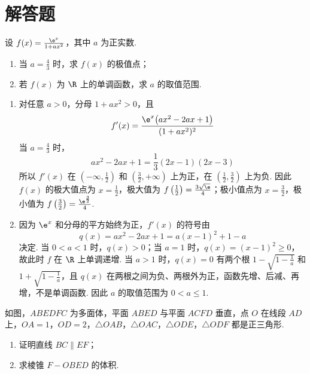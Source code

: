 \section{解答题}

\begin{problem}
设 \( f(x) = \frac{\e^x}{1 + ax^2} \)，其中 \( a \) 为正实数.

\begin{enumerate}
\item 当 \(a=\frac{4}{3}\) 时，求 \( f(x) \) 的极值点；
\item 若 \( f(x) \) 为 \(\R\) 上的单调函数，求 \( a \) 的取值范围.
\end{enumerate}
\end{problem}

\begin{solution}
\begin{enumerate}
\item 对任意 \(a>0\)，分母 \(1+ax^2>0\)，且
\[
f'(x)=\frac{\e^x\bigl(ax^2-2ax+1\bigr)}{(1+ax^2)^2}
\]
当 \(a=\frac43\) 时，
\[
ax^2-2ax+1=\frac13(2x-1)(2x-3)
\]
所以 \(f'(x)\) 在 \(\left(-\infty,\frac12\right)\) 和 \(\left(\frac32,+\infty\right)\) 上为正，在 \(\left(\frac12,\frac32\right)\) 上为负. 因此 \(f(x)\) 的极大值点为 \(x=\frac12\)，极大值为 \(f\left(\frac12\right)=\frac{3\sqrt{\e}}4\)；极小值点为 \(x=\frac32\)，极小值为 \(f\left(\frac32\right)=\frac{\e^{\frac{3}{2}}}4\).
\item 因为 \(\e^x\) 和分母的平方始终为正，\(f'(x)\) 的符号由
\[
q(x)=ax^2-2ax+1=a(x-1)^2+1-a
\]
决定. 当 \(0<a<1\) 时，\(q(x)>0\)；当 \(a=1\) 时，\(q(x)=(x-1)^2\geqslant0\)，故此时 \(f\) 在 \(\R\) 上单调递增. 当 \(a>1\) 时，\(q(x)=0\) 有两个根 \(1-\sqrt{1-\frac1a}\) 和 \(1+\sqrt{1-\frac1a}\)，且 \(q(x)\) 在两根之间为负、两根外为正，函数先增、后减、再增，不是单调函数. 因此 \(a\) 的取值范围为 \(0<a\leqslant1\).
\end{enumerate}
\end{solution}

\begin{problem}
如图，\(ABEDFC\) 为多面体，平面 \(ABED\) 与平面 \(ACFD\) 垂直，点 \(O\) 在线段 \(AD\) 上，\(OA = 1\)，\(OD = 2\)，\(\triangle OAB\)，\(\triangle OAC\)，\(\triangle ODE\)，\(\triangle ODF\) 都是正三角形.

\begin{enumerate}
\item 证明直线 \(BC \parallel EF\)；
\item 求棱锥 \(F-OBED\) 的体积.
\end{enumerate}

\end{problem}

